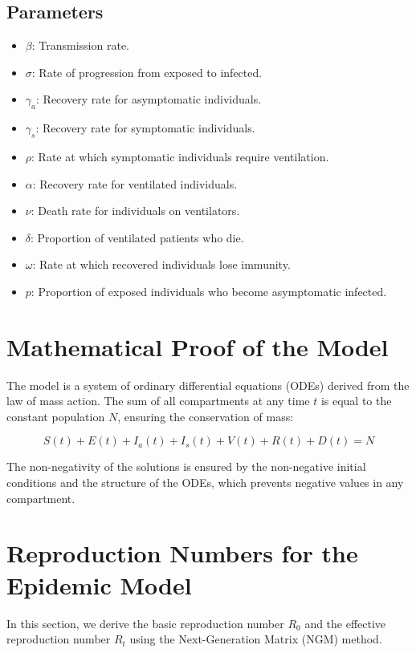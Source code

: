 \documentclass[lettersize, journal]{IEEEtran}
\begin{document}
\subsection{Parameters}
\begin{itemize}
    \item \( \beta \): Transmission rate.
    \item \( \sigma \): Rate of progression from exposed to infected.
    \item \( \gamma_a \): Recovery rate for asymptomatic individuals.
    \item \( \gamma_s \): Recovery rate for symptomatic individuals.
    \item \( \rho \): Rate at which symptomatic individuals require ventilation.
    \item \( \alpha \): Recovery rate for ventilated individuals.
    \item \( \nu \): Death rate for individuals on ventilators.
    \item \( \delta \): Proportion of ventilated patients who die.
    \item \( \omega \): Rate at which recovered individuals lose immunity.
    \item \( p \): Proportion of exposed individuals who become asymptomatic infected.
\end{itemize}

\section{Mathematical Proof of the Model}
The model is a system of ordinary differential equations (ODEs) derived from the law of mass action. The sum of all compartments at any time \( t \) is equal to the constant population \( N \), ensuring the conservation of mass:

\[ S(t) + E(t) + I_a(t) + I_s(t) + V(t) + R(t) + D(t) = N \]

The non-negativity of the solutions is ensured by the non-negative initial conditions and the structure of the ODEs, which prevents negative values in any compartment.

\section{Reproduction Numbers for the Epidemic Model}
In this section, we derive the basic reproduction number \( R_0 \) and the effective reproduction number \( R_t \) using the Next-Generation Matrix (NGM) method.
\end{document}
